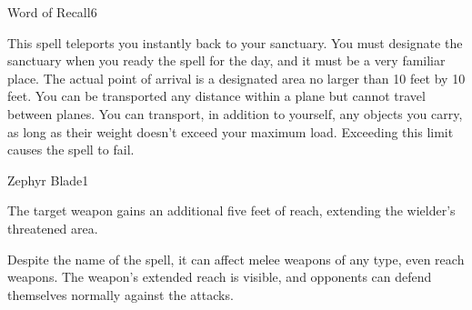 \begin{spellsection}{Word of Recall}{6}
    \begin{spellheader}
    \end{spellheader}
    \begin{spellcontent}
        \begin{spelltargetinginfo}
        \end{spelltargetinginfo}
        \begin{spelleffects}
            \spelleffect This spell teleports you instantly back to your sanctuary. You must designate the sanctuary when you ready the spell for the day, and it must be a very familiar place. The actual point of arrival is a designated area no larger than 10 feet by 10 feet. You can be transported any distance within a plane but cannot travel between planes. You can transport, in addition to yourself, any objects you carry, as long as their weight doesn't exceed your maximum load. Exceeding this limit causes the spell to fail.
        \end{spelleffects}
    \end{spellcontent}
    \begin{spellfooter}
        \miscastexplode
    \end{spellfooter}
\end{spellsection}

\begin{spellsection}{Zephyr Blade}{1}
    \begin{spellheader}
    \end{spellheader}
    \begin{spellcontent}
        \begin{spelltargetinginfo}
        \end{spelltargetinginfo}
        \begin{spelleffects}
            \spelleffect The target weapon gains an additional five feet of reach, extending the wielder's threatened area.
            \spelldur \durpersonallong
        \end{spelleffects}
    \end{spellcontent}
    \begin{spellfooter}
        \spellnotes Despite the name of the spell, it can affect melee weapons of any type, even reach weapons. The weapon's extended reach is visible, and opponents can defend themselves normally against the attacks.
        \miscastexplode
    \end{spellfooter}
\end{spellsection}

